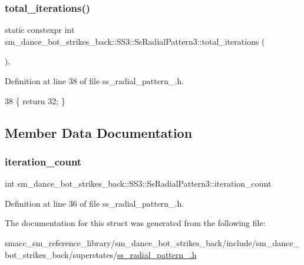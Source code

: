 \subsubsection{\texorpdfstring{total\+\_\+iterations()}{total\_iterations()}}
{\footnotesize\ttfamily static constexpr int sm\+\_\+dance\+\_\+bot\+\_\+strikes\+\_\+back\+::\+S\+S3\+::\+Ss\+Radial\+Pattern3\+::total\+\_\+iterations (\begin{DoxyParamCaption}{ }\end{DoxyParamCaption})\hspace{0.3cm}{\ttfamily [inline]}, {\ttfamily [static]}}



Definition at line 38 of file ss\+\_\+radial\+\_\+pattern\+\_.\+h.


\begin{DoxyCode}
38 \{ \textcolor{keywordflow}{return} 32; \}
\end{DoxyCode}


\subsection{Member Data Documentation}
\mbox{\label{structsm__dance__bot__strikes__back_1_1SS3_1_1SsRadialPattern3_a133c7023088496662119b728f7a6a678}} 
\subsubsection{\texorpdfstring{iteration\+\_\+count}{iteration\_count}}
{\footnotesize\ttfamily int sm\+\_\+dance\+\_\+bot\+\_\+strikes\+\_\+back\+::\+S\+S3\+::\+Ss\+Radial\+Pattern3\+::iteration\+\_\+count}



Definition at line 36 of file ss\+\_\+radial\+\_\+pattern\+\_.\+h.



The documentation for this struct was generated from the following file\+:\begin{DoxyCompactItemize}
\item 
smacc\+\_\+sm\+\_\+reference\+\_\+library/sm\+\_\+dance\+\_\+bot\+\_\+strikes\+\_\+back/include/sm\+\_\+dance\+\_\+bot\+\_\+strikes\+\_\+back/superstates/\hyperlink{strikes__back_2include_2sm__dance__bot__strikes__back_2superstates_2ss__radial__pattern__3_8h}{ss\+\_\+radial\+\_\+pattern\+\_.\+h}\end{DoxyCompactItemize}
